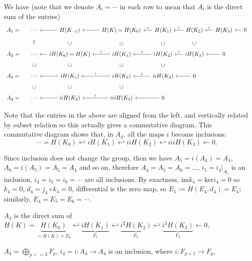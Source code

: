 \documentclass{article}
\newcommand{\verteq}{\rotatebox{90}{$\,=$}}
\theoremstyle{mystyle}
\theoremstyle{remark}
\numberwithin{equation}{section}
\begin{document}



We have (note that we denote $A_i=\cdots$ in each row to mean that $A_i$ is the direct sum of the entries)
$$
\begin{tikzcd}[column sep = small, row sep = 0.15cm]
A_1 = &\cdots &\ar[l]H(K_{-1})&\ar[l]H(K)=H(K_0)&\ar[l,"i"'] H(K_1)&\ar[l,"i"'] H(K_2) & \ar[l,"i"'] H(K_3) & \ar[l]0 \\
~&\verteq & \cup & \cup & \cup & \cup &~\\
A_2 = &\cdots &\ar[l]iH(K_0)=H(K) & \ar[l,hook',"i"']iH(K_1) & \ar[l,"i"'] iH(K_2) & \ar[l,"i"']iH(K_3) & \ar[l] 0 &\\
~&\cup & \cup & \cup & \cup &~& ~\\
A_3 = &\cdots& \ar[l,hook']  i H(K_1) & \ar[l,hook',"i"'] iH(K_2) & \ar[l,"i"'] iiH(K_3) & \ar[l] 0 &&\\
&\cup & \cup & \cup && \\
A_4 = & \cdots&\ar[l,hook']  iiH(K_2) & \ar[l,hook',"i"']  iiiH(K_3) & \ar[l] 0
\end{tikzcd}
$$

Note that the entries in the above are aligned from the left, and vertically related by subset relation so this actually gives a commutative diagram. This commutative diagram shows that, in $A_4$, all the maps $i$ become inclusions:
$$\cdots =H(K_0)\hookleftarrow iH(K_1)\hookleftarrow iiH(K_2) \hookleftarrow iiiH(K_3)\leftarrow 0.$$

Since inclusion does not change the group, then we have $A_5 = i(A_4) = A_4$, $A_6 = i(A_5) = A_5 = A_4$ and so on, therefore $A_4 = A_5=A_6=...$, $i_5 = i_4 |_{A_5}$ is an inclusion, $i_4 =i_5 = i_6=\cdots$ are all inclusions. By exactness, $\mathrm{im}k_4 = \mathrm{ker}i_4 = 0$ so $k_4=0$, $d_4 = j_4\circ k_4 = 0$, differential is the zero map, so $E_5 := H(E_4,d_4) = E_4$; similarly, $E_4=E_5=E_6=\cdots$. 

$A_4$ is the direct sum of $H(K)= \underbrace{H(K_0)}_{=H(K)=F_0}\hookleftarrow \underbrace{iH(K_1)}_{F_1} \hookleftarrow \underbrace{i^2H(K_2)}_{F_2}\hookleftarrow \underbrace{i^3H(K_3)}_{F_3}\leftarrow 0$,

$A_4 = \bigoplus _{p<=3} F_p$, $i_4=i\colon A_4\rightarrow A_4$ is an inclusion, where $i\colon F_{p+1}\rightarrow F_p$, 
\end{document}
